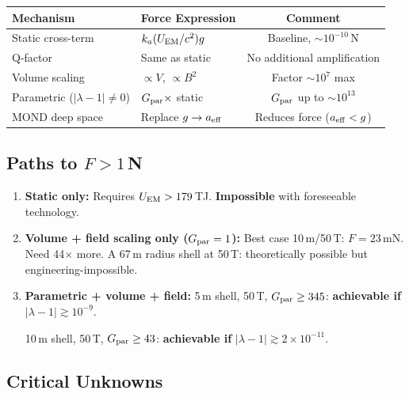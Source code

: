 \documentclass[11pt]{article}
\newcommand{\ka}{k_a}
\begin{document}
\begin{center}
\begin{tabular}{llc}
\toprule
Mechanism & Force Expression & Comment \\
\midrule
Static cross-term & $\ka(U_{\rm EM}/c^2)g$ & Baseline, $\sim 10^{-10}$\,N \\
Q-factor & Same as static & No additional amplification \\
Volume scaling & $\propto V$, $\propto B^2$ & Factor $\sim 10^7$ max \\
Parametric ($|\lambda-1| \neq 0$) & $G_{\rm par} \times$ static & $G_{\rm par}$ up to $\sim 10^{13}$ \\
MOND deep space & Replace $g \to a_{\rm eff}$ & Reduces force ($a_{\rm eff} < g$) \\
\bottomrule
\end{tabular}
\end{center}

\subsection{Paths to $F > 1$\,N}

\begin{enumerate}
\item \textbf{Static only:} Requires $U_{\rm EM} > 179$\,TJ.
  \textbf{Impossible} with foreseeable technology.

\item \textbf{Volume + field scaling only ($G_{\rm par} = 1$):}
  Best case 10\,m/50\,T: $F = 23$\,mN. Need 44$\times$ more.
  A 67\,m radius shell at 50\,T: theoretically possible but
  engineering-impossible.

\item \textbf{Parametric + volume + field:}
  5\,m shell, 50\,T, $G_{\rm par} \geq 345$: \textbf{achievable if}
  $|\lambda - 1| \gtrsim 10^{-9}$.

  10\,m shell, 50\,T, $G_{\rm par} \geq 43$: \textbf{achievable if}
  $|\lambda - 1| \gtrsim 2 \times 10^{-11}$.
\end{enumerate}

\subsection{Critical Unknowns}
\end{document}

